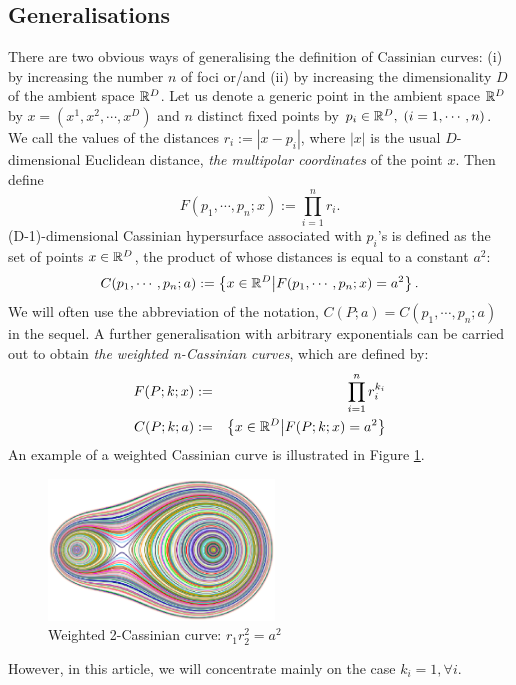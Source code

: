 \documentclass{article}
\begin{document}
\subsection{Generalisations}
\label{sec-1-2}
There are two obvious ways of generalising the definition of Cassinian curves: (i) by increasing the number $n$ of foci or/and (ii) by increasing the dimensionality $D$ of the ambient space $\mathbb R^{D}$. 
Let us denote a generic point in the ambient space $\mathbb R^{D}$ by $x =(x^1, x^2, \cdots, x^D)$ and $n$ distinct fixed points by $p_i \in \mathbb R^D, \; (i=1,\cdots, n)$. 
We call the values of the distances $r_i := |x-p_i|$, where $|x|$ is the usual $D$-dimensional Euclidean distance, \emph{the multipolar coordinates} of the point $x$.
 Then define 
\begin{equation}
\label{}
F(p_1,\cdots,p_n;x):=\prod_{i=1}^{n} r_i.
\end{equation}
(D-1)-dimensional Cassinian hypersurface associated with $p_i$'s is defined as the set of points $x\in \mathbb R^D$, the product of whose distances is equal to a constant $a^2$:
\begin{equation}
\label{ }
C(p_1,\cdots,p_n;a) :=\left\{ {x\in \mathbb R^D} \big| {F(p_1,\cdots,p_n;x) = a^2 } \right\}.
\end{equation}
We will often use the abbreviation of the notation, $C(P;a)=C(p_1,\cdots,p_n;a)$ in the sequel. 
A further generalisation with arbitrary exponentials can be carried out to obtain \emph{the weighted n-Cassinian curves}, which are defined by:
\begin{eqnarray}
F(P;k;x) & := & \prod_{i=1}^{n} r_i^{k_i} \nonumber\\
C(P;k;a) &:=&\left\{ {x\in \mathbb R^D} \big| {F(P;k;x) = a^2 } \right\}
\end{eqnarray}
An example of a weighted Cassinian curve is illustrated in Figure \ref{fig:weited_2_cass}.
\begin{figure}[h]
\begin{center}
\includegraphics[width=6cm]{cassini2_weighted.eps}
\caption{Weighted 2-Cassinian curve: $r_1 r_2^2 = a^2$}
\label{fig:weited_2_cass}
\end{center}
\end{figure}
However, in this article, we will concentrate mainly on the case $k_i = 1, \forall i$.
\end{document}
